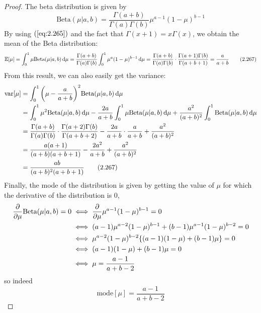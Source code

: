 \vspace{1em}

\begin{proof}
    The beta distribution is given by
    \begin{equation}\label{eq:2.13}\tag{2.13}
        \text{Beta}(\mu | a, b) = \frac{\Gamma(a + b)}{\Gamma(a)\Gamma(b)} \mu^{a - 1}(1 - \mu)^{b - 1}
    \end{equation}
    By using $(\ref{eq:2.265})$ and the fact that $\Gamma(x + 1) = x\Gamma(x)$, we 
    obtain the mean of the Beta distribution:
    \begin{align*}
        \mathbb{E}[\mu] 
        = \int_{0}^{1} \mu \text{Beta}(\mu | a, b) \mathop{}\!\mathrm{d} \mu 
        = \frac{\Gamma(a + b)}{\Gamma(a)\Gamma(b)} \int_{0}^{1} \mu^a (1 - \mu)^{b - 1} \mathop{}\!\mathrm{d} \mu 
        = \frac{\Gamma(a+b)}{\Gamma(a)\Gamma(b)} \cdot \frac{\Gamma(a + 1)\Gamma(b)}{\Gamma(a + b + 1)}
        = \frac{a}{a + b}
        \tag{2.267}
    \end{align*}
    From this result, we can also easily get the variance:
    \begin{align*}
        \text{var}[\mu] 
        &= \int_{0}^{1} \bigg(\mu - \frac{a}{a + b}\bigg)^2 \text{Beta}(\mu | a,b) \mathop{}\!\mathrm{d} \mu \\
        &= \int_{0}^{1} \mu^2 \text{Beta}(\mu | a, b) \mathop{}\!\mathrm{d} \mu 
        - \frac{2a}{a + b} \int_{0}^{1} \mu\text{Beta}(\mu | a, b) \mathop{}\!\mathrm{d} \mu
        + \frac{a^2}{(a + b)^2} \int_{0}^{1} \text{Beta}(\mu | a, b) \mathop{}\!\mathrm{d} \mu \\
        &= \frac{\Gamma(a+b)}{\Gamma(a)\Gamma(b)} \cdot \frac{\Gamma(a + 2)\Gamma(b)}{\Gamma(a + b + 2)}
        - \frac{2a}{a+b} \cdot \frac{a}{a + b} + \frac{a^2}{(a+b)^2} \\
        &= \frac{a(a + 1)}{(a + b)(a + b + 1)} - \frac{2a^2}{a + b} + \frac{a^2}{(a + b)^2} \\
        &= \frac{ab}{(a + b)^2(a + b + 1)}
        \tag{2.267}
    \end{align*}
    Finally, the mode of the distribution is given by getting the value of
    $\mu$ for which the derivative of the distribution is 0,
    \begin{align*}
        \pdv{\mu} \text{Beta}(\mu | a, b) = 0 
        &\iff \pdv{\mu} \mu^{a - 1}(1 - \mu)^{b - 1} = 0 \\
        &\iff (a - 1)\mu^{a - 2}(1 - \mu)^{b - 1} + (b - 1)\mu^{a - 1}(1 - \mu)^{b - 2} = 0 \\
        &\iff \mu^{a - 2}(1 - \mu)^{b - 2}\{(a - 1)(1 - \mu) + (b - 1)\mu\} = 0 \\
        &\iff (a - 1)(1 - \mu) + (b - 1)\mu = 0 \\
        &\iff \mu = \frac{a - 1}{a + b - 2}
    \end{align*}
    so indeed
    \[
        \text{mode}[\mu] = \frac{a - 1}{a + b - 2} \tag{2.268}
    \] 
\end{proof}

